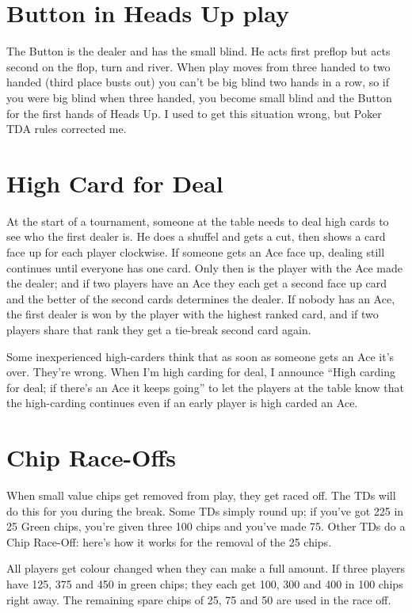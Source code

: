 \section{Button in Heads Up play}

The Button is the dealer and has the small blind. He acts first preflop
but acts second on the flop, turn and river. When play moves from
three handed to two handed (third place busts out) you can't be big blind
two hands in a row, so if you were big blind when three handed, you become
small blind and the Button for the first hands of Heads Up. I used to
get this situation wrong, but Poker TDA rules corrected me.

\section{High Card for Deal}

At the start of a tournament, someone at the table needs to deal high
cards to see who the first dealer is. He does a shuffel and gets a cut,
then shows a card face up for each player clockwise. If someone gets an
Ace face up, dealing still continues until everyone has one card. Only
then is the player with the Ace made the dealer; and if two players
have an Ace they each get a second face up card and the better of the
second cards determines the dealer. If nobody has an Ace, the first
dealer is won by the player with the highest ranked card, and if two
players share that rank they get a tie-break second card again.

Some inexperienced high-carders think that as soon as someone gets an
Ace it's over. They're wrong. When I'm high carding for deal, I
announce ``High carding for deal; if there's an Ace it keeps going''
to let the players at the table know that the high-carding continues
even if an early player is high carded an Ace.

\section{Chip Race-Offs}

When small value chips get removed from play, they get raced off. The
TDs will do this for you during the break. Some TDs simply round up;
if you've got 225 in 25 Green chips, you're given three 100 chips and
you've made 75. Other TDs do a Chip Race-Off: here's how it works for
the removal of the 25 chips.

All players get colour changed when they can make a full amount. If
three players have 125, 375 and 450 in green chips; they each get 100,
300 and 400 in 100 chips right away. The remaining spare chips of 25,
75 and 50 are used in the race off.

